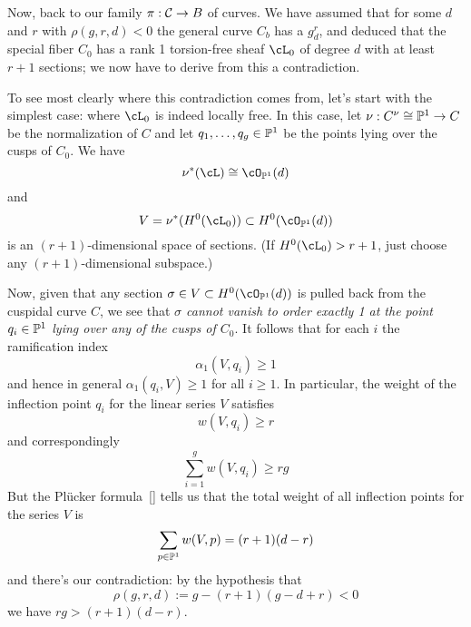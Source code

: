 %


Now, back to our family $\pi : \cC \to B$ of curves. We have assumed that for some $d$ and $r$ with $\rho(g,r,d) < 0$ the general curve $C_b$ has a $g^r_d$, and deduced that the special fiber $C_0$ has a rank 1 torsion-free sheaf $\cL_0$ of degree $d$ with at least $r+1$ sections; we now have to derive from this a contradiction.

To see most clearly where this contradiction comes from, let's start with the simplest case: where $\cL_0$ is indeed locally free. In this case, let $\nu :  C^\nu \cong \PP^1 \to C$ be the normalization of $C$ and let $q_1,\dots, q_g \in \PP^1$ be the points lying over the cusps of $C_0$. We have
$$
\nu^*(\cL) \cong \cO_{\PP^1}(d)
$$  
and 
$$
V = \nu^*(H^0(\cL_0)) \subset H^0(\cO_{\PP^1}(d))
$$
is an $(r+1)$-dimensional space of sections. (If $H^0(\cL_0) > r+1$, just choose any $(r+1)$-dimensional subspace.) 

Now, given that any section $\sigma \in V \subset H^0(\cO_{\PP^1}(d))$ is pulled back from the cuspidal curve $C$, we see that \emph{$\sigma$ cannot vanish to order exactly 1 at the point $q_i \in \PP^1$ lying over any of the cusps of $C_0$}. It follows that for each $i$ the ramification index 
$$
\alpha_1(V,q_i) \geq 1 
$$
and hence in  general $\alpha_1(q_i,V) \geq 1$ for all $i \geq 1$. In particular, the weight of the inflection point $q_i$ for the linear series $V$ satisfies
$$
w(V, q_i) \geq r
$$
and correspondingly
$$
\sum_{i=1}^g w(V, q_i) \geq rg
$$
But the Pl\"ucker formula~\ref{} tells us that the total weight of all inflection points for the series $V$ is
$$
\sum_{p \in \PP^1} w(V,p) = (r+1)(d-r)
$$
and there's our contradiction: by the hypothesis that 
$$
\rho(g,r,d) := g - (r+1)(g-d+r) < 0
$$
we have $rg > (r+1)(d-r)$.

